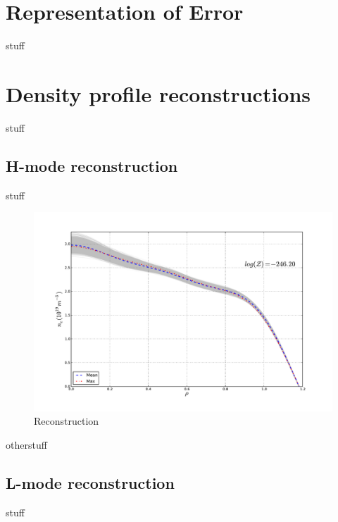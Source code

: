 \documentclass	[12pt]{article}
\begin{document}
\section{Representation of Error}
stuff
\section{Density profile reconstructions}
stuff
\subsection{H-mode reconstruction}
stuff
\begin{figure}[ht]
	\centering
	\includegraphics[width=12cm,keepaspectratio=true]{figures/bfit146102_00505_all5}
	\vspace{-30pt}
	\caption{Reconstruction}
\label{hi}
\end{figure}
otherstuff
\subsection{L-mode reconstruction}
stuff
\end{document}
